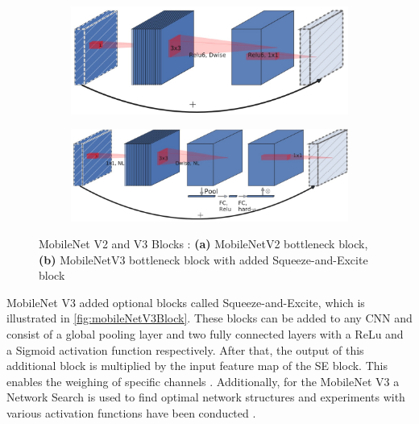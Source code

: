 \begin{figure}[H]
    \centering
    \begin{subfigure}{0.6\textwidth}
        \centering
        \includegraphics[width=\linewidth, keepaspectratio]{PICs/backbones/mobilenetv2_bottleneck.jpg}
        \caption{}
        \label{fig:mobileNetV2Block}
    \end{subfigure}
    \qquad
    \begin{subfigure}{0.6\textwidth}
        \centering
        \vspace{0.8cm}
        \includegraphics[width=\linewidth, keepaspectratio]{PICs/backbones/mobilenetv3_bottleneck_SE.jpg}
        \caption{}
        \label{fig:mobileNetV3Block}
    \end{subfigure}
    \caption{MobileNet V2 and V3 Blocks \cite{MobileNetV3}: \textbf{(a)} MobileNetV2 bottleneck block, \textbf{(b)} MobileNetV3 bottleneck block with added Squeeze-and-Excite block}
    \label{fig:mobileNetBlocks}
\end{figure}


\noindent MobileNet V3 added optional blocks called Squeeze-and-Excite, which is illustrated in \autoref{fig:mobileNetV3Block}. 
These blocks can be added to any \ac{CNN} and consist of a global pooling layer and two fully connected layers with a ReLu and a Sigmoid activation function respectively.
After that, the output of this additional block is multiplied by the input feature map of the SE block.
This enables the weighing of specific channels \cite{SqueezeAndExcitation2019}.
Additionally, for the MobileNet V3 a Network Search is used to find optimal network structures and experiments with various activation functions have been conducted \cite{MobileNetV3}.

